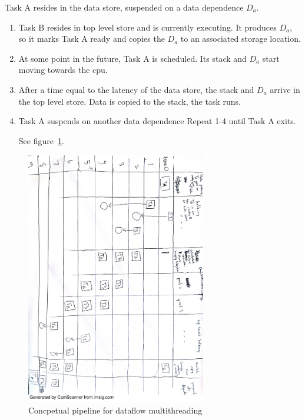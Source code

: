 Task A resides in the data store, suspended on a data dependence $D_a$.
\begin{enumerate}

    \item Task B resides in top level store and is currently executing. It
        produces $D_a$, so it marks Task A ready and copies the $D_a$ to an
        associated storage location.
    \item At some point in the future, Task A is scheduled. Its stack
        and $D_a$ start moving towards the cpu.
    \item After a time equal to the latency of the data store, the
        stack and $D_a$ arrive in the top level store. Data is
        copied to the stack, the task runs.
    \item Task A suspends on another data dependence
        Repeat 1-4 until Task A exits.

        See figure~\ref{fig:pipeline}.

\end{enumerate}

\begin{figure}[htbp]
    \begin{center}
      \includegraphics[width=0.7\textwidth,angle=90]{figs/pipeline.pdf}
    \end{center}
    \caption{Concpetual pipeline for dataflow multithreading}
    \label{fig:pipeline}
\end{figure}

